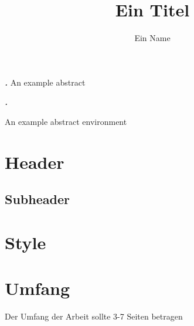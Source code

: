 \documentclass[
enable-debug,
debug,
german,
showframe,
]{t3_3000}
\title{Ein Titel}
\author{Ein Name}
\begin{document}
\maketitle

\renewenvironment{abstract}{%
  \quotation
  \footnotesize
  \textbf{\textit{\abstractname.}} %
}{\endquotation}\abstract{An example abstract}

\begin{abstract}
	An example abstract environment

\end{abstract}

\section{Header}

\subsection{Subheader}

\section{Style}

\lipsum[5-10]

\section{Umfang}
Der Umfang der Arbeit sollte 3-7 Seiten betragen \autocite[Abschnitt 5.2]{FKT:Leitlinien:2021}

\printbibliography
\end{document}
